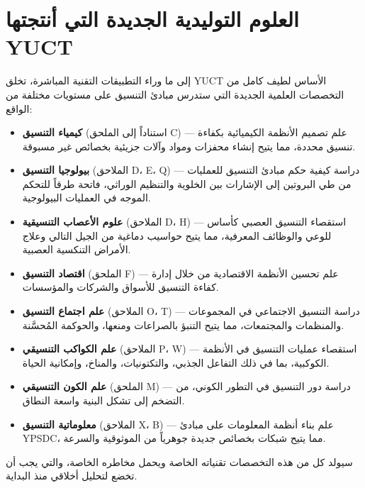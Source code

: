 \documentclass[12pt,a4paper]{article}
\theoremstyle{remark}
\begin{document}
	\section{العلوم التوليدية الجديدة التي أنتجتها YUCT}
	\label{sec:generative}
	
	إلى ما وراء التطبيقات التقنية المباشرة، تخلق YUCT الأساس لطيف كامل من التخصصات العلمية الجديدة التي ستدرس مبادئ التنسيق على مستويات مختلفة من الواقع:
	
	\begin{itemize}[leftmargin=*]
		\item \textbf{كيمياء التنسيق} (استناداً إلى الملحق C) — علم تصميم الأنظمة الكيميائية بكفاءة تنسيق محددة، مما يتيح إنشاء محفزات ومواد وآلات جزيئية بخصائص غير مسبوقة.
		
		\item \textbf{بيولوجيا التنسيق} (الملاحق D، E، Q) — دراسة كيفية حكم مبادئ التنسيق للعمليات من طي البروتين إلى الإشارات بين الخلوية والتنظيم الوراثي، فاتحة طرقاً للتحكم الموجه في العمليات البيولوجية.
		
		\item \textbf{علوم الأعصاب التنسيقية} (الملاحق D، H) — استقصاء التنسيق العصبي كأساس للوعي والوظائف المعرفية، مما يتيح حواسيب دماغية من الجيل التالي وعلاج الأمراض التنكسية العصبية.
		
		\item \textbf{اقتصاد التنسيق} (الملحق F) — علم تحسين الأنظمة الاقتصادية من خلال إدارة كفاءة التنسيق للأسواق والشركات والمؤسسات.
		
		\item \textbf{علم اجتماع التنسيق} (الملاحق O، T) — دراسة التنسيق الاجتماعي في المجموعات والمنظمات والمجتمعات، مما يتيح التنبؤ بالصراعات ومنعها، والحوكمة المُحسَّنة.
		
		\item \textbf{علم الكواكب التنسيقي} (الملاحق P، W) — استقصاء عمليات التنسيق في الأنظمة الكوكبية، بما في ذلك التفاعل الجذبي، والتكتونيات، والمناخ، وإمكانية الحياة.
		
		\item \textbf{علم الكون التنسيقي} (الملحق M) — دراسة دور التنسيق في التطور الكوني، من التضخم إلى تشكل البنية واسعة النطاق.
		
		\item \textbf{معلوماتية التنسيق} (الملاحق X، B) — علم بناء أنظمة المعلومات على مبادئ YPSDC، مما يتيح شبكات بخصائص جديدة جوهرياً من الموثوقية والسرعة.
	\end{itemize}
	
	سيولد كل من هذه التخصصات تقنياته الخاصة ويحمل مخاطره الخاصة، والتي يجب أن تخضع لتحليل أخلاقي منذ البداية.
	
\end{document}
